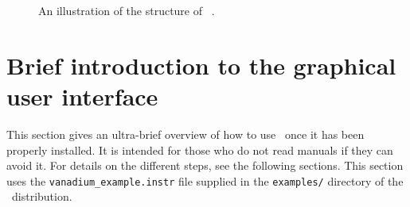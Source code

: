 \begin{figure}[htb!]
\begin{center}

\end{center}
\caption{An illustration of the structure of \MCS\ .}
\label{fig:structure}
\end{figure}

\section{Brief introduction to the graphical user interface}
\label{s:brief}

This section gives an ultra-brief overview of how to use \MCS\ once it
has been properly installed. It is intended for those who do not read
manuals if they can avoid it. For details on the different steps, see
the following sections. This section uses the
\verb+vanadium_example.instr+ file supplied in the \verb+examples/+
directory of the \MCS\ distribution. %

